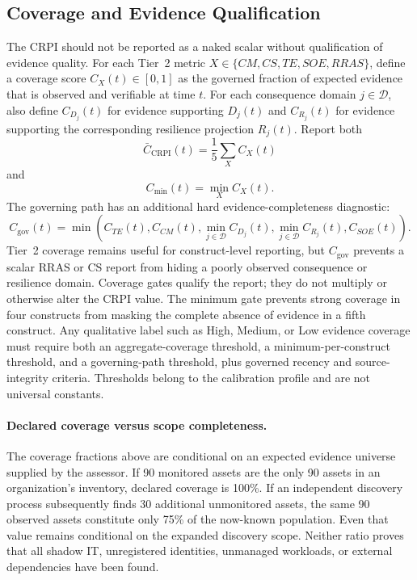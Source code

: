 \documentclass[11pt]{article}
\begin{document}
\subsection{Coverage and Evidence Qualification}
The CRPI should not be reported as a naked scalar without qualification of evidence
quality. For each Tier~2 metric $X\in\{CM,CS,TE,SOE,RRAS\}$, define a coverage score
$C_X(t)\in[0,1]$ as the governed fraction of expected evidence that is observed and
verifiable at time $t$. For each consequence domain $j\in\mathcal{D}$, also define
$C_{D_j}(t)$ for evidence supporting $D_j(t)$ and $C_{R_j}(t)$ for evidence supporting
the corresponding resilience projection $R_j(t)$. Report both
\begin{equation}
  \bar C_{\mathrm{CRPI}}(t)=
  \frac{1}{5}\sum_X C_X(t)
\end{equation}
and
\begin{equation}
  C_{\min}(t)=\min_X C_X(t).
\end{equation}
The governing path has an additional hard evidence-completeness diagnostic:
\begin{equation}
  C_{\mathrm{gov}}(t)=\min\left(
    C_{TE}(t),C_{CM}(t),\min_{j\in\mathcal{D}}C_{D_j}(t),
    \min_{j\in\mathcal{D}}C_{R_j}(t),C_{SOE}(t)
  \right).
  \label{eq:governing-coverage}
\end{equation}
Tier~2 coverage remains useful for construct-level reporting, but $C_{\mathrm{gov}}$
prevents a scalar RRAS or CS report from hiding a poorly observed consequence or
resilience domain. Coverage gates qualify the report; they do not multiply or otherwise
alter the CRPI value.
The minimum gate prevents strong coverage in four constructs from masking the complete
absence of evidence in a fifth construct. Any qualitative label such as High, Medium,
or Low evidence coverage must require both an aggregate-coverage threshold, a
minimum-per-construct threshold, and a governing-path threshold, plus governed recency
and source-integrity criteria.
Thresholds belong to the calibration profile and are not universal constants.


\paragraph{Declared coverage versus scope completeness.}
The coverage fractions above are conditional on an expected evidence
universe supplied by the assessor. If 90 monitored assets are the only
90 assets in an organization's inventory, declared coverage is 100\%.
If an independent discovery process subsequently finds 30 additional
unmonitored assets, the same 90 observed assets constitute only 75\%
of the now-known population. Even that value remains conditional
on the expanded discovery scope. Neither ratio proves that all
shadow IT, unregistered identities, unmanaged workloads, or external
dependencies have been found.
\end{document}
